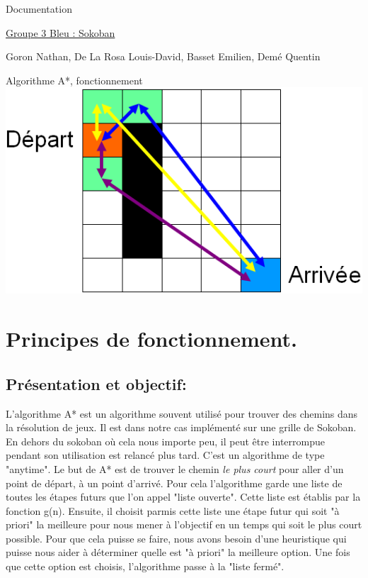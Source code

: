 \documentclass{article}
\begin{document}
\begin{titlepage}
\begin{center}
\Huge Documentation

\normalsize
\vspace{0.5cm}
\Large {\underline{ Groupe 3 Bleu : Sokoban} }

\vspace{1cm}
\normalsize
Goron Nathan, De La Rosa Louis-David, Basset Emilien, Demé Quentin
\newline
\newline

\Huge Algorithme A*, fonctionnement \newline
\vspace{2cm}
\includegraphics[scale=0.7]{images/exemple.png}
\end{center}
\end{titlepage}


\newpage
\section{Principes de fonctionnement.}
\subsection{Présentation et objectif:}
L'algorithme A* est un algorithme souvent utilisé pour trouver des chemins dans la résolution de jeux. Il est dans notre cas implémenté sur une grille de Sokoban. En dehors du sokoban où cela nous importe peu, il peut être interrompue pendant son utilisation est relancé plus tard. C'est un algorithme de type "anytime".
Le but de A* est de trouver le chemin \textit{le plus court} pour aller d'un point de départ, à un point d'arrivé. Pour cela l'algorithme garde une liste de toutes les étapes futurs que l'on appel "liste ouverte". Cette liste est établis par la fonction g(n). Ensuite, il choisit parmis cette liste une étape futur qui soit "à priori" la meilleure pour nous mener à l'objectif en un temps qui soit le plus court possible. Pour que cela puisse se faire, nous avons besoin d'une heuristique qui puisse nous aider à déterminer quelle est "à priori" la meilleure option. Une fois que cette option est choisis, l'algorithme passe à la "liste fermé". 
\end{document}
